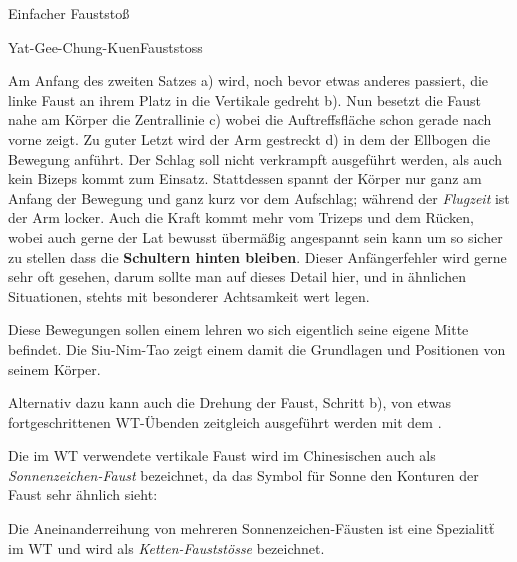 
\begin{WTSatz}{Einfacher Fauststo{\ss}}%
	
	
	\begin{WTSatzTeil}{Yat-Gee-Chung-Kuen}{Fauststoss}
		
		Am Anfang des zweiten Satzes a) wird, noch bevor etwas anderes passiert, die linke Faust an ihrem Platz in die Vertikale gedreht b). Nun besetzt die Faust nahe am K\"orper die Zentrallinie c) wobei die Auftreffsfl\"ache schon gerade nach vorne zeigt. Zu guter Letzt wird der Arm gestreckt d) in dem der Ellbogen die Bewegung anf\"uhrt. Der Schlag soll nicht verkrampft ausgef\"uhrt werden, als auch kein Bizeps kommt zum Einsatz. Stattdessen spannt der K\"orper nur ganz am Anfang der Bewegung und ganz kurz vor dem Aufschlag; w\"ahrend der \textit{Flugzeit} ist der Arm locker. Auch die Kraft kommt mehr vom Trizeps und dem R\"ucken, wobei auch gerne der Lat bewusst \"uberm\"a{\ss}ig angespannt sein kann um so sicher zu stellen dass die \textbf{Schultern hinten bleiben}. Dieser Anf\"angerfehler wird gerne sehr oft gesehen, darum sollte man auf dieses Detail hier, und in \"ahnlichen Situationen, stehts mit besonderer Achtsamkeit wert legen.
		
		Diese Bewegungen sollen einem lehren wo sich eigentlich seine eigene Mitte befindet. Die Siu-Nim-Tao zeigt einem damit die Grundlagen und Positionen von seinem K\"orper.
		
		Alternativ dazu kann auch die Drehung der Faust, Schritt b), von etwas fortgeschrittenen WT-\"Ubenden zeitgleich ausgef\"uhrt werden mit dem .
		
	\begin{WTCommonBegriff}
		Die im WT verwendete vertikale Faust wird im Chinesischen auch als \textit{Sonnenzeichen-Faust} bezeichnet, da das Symbol f\"ur Sonne den Konturen der Faust sehr \"ahnlich sieht:
		
		\flushleft
		
		Die Aneinanderreihung von mehreren Sonnenzeichen-F\"austen ist eine Spezialit\"t im WT und wird als \textit{Ketten-Faustst\"osse} bezeichnet. %
	\end{WTCommonBegriff}
			

\end{WTSatzTeil}
\end{WTSatz}
